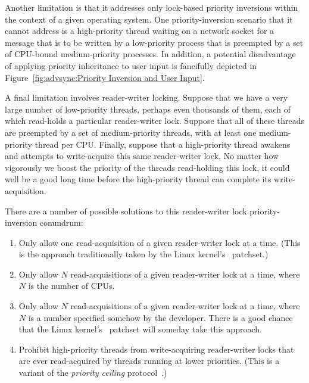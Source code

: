 Another limitation is that it addresses only lock-based priority
inversions within the context of a given operating system.
One priority-inversion scenario that it cannot address is a high-priority
thread waiting on a network socket for a message that is to be written
by a low-priority process that is preempted by a set of CPU-bound
medium-priority processes.
In addition, a potential disadvantage of applying priority inheritance
to user input is fancifully depicted in
Figure~\ref{fig:advsync:Priority Inversion and User Input}.

A final limitation involves reader-writer locking.
Suppose that we have a very large number of low-priority threads, perhaps
even thousands of them, each
of which read-holds a particular reader-writer lock.
Suppose that all of these threads are preempted by a set of medium-priority
threads, with at least one medium-priority thread per CPU.
Finally, suppose that a high-priority thread awakens and attempts to
write-acquire this same reader-writer lock.
No matter how vigorously we boost the priority of the threads read-holding
this lock, it could well be a good long time before the high-priority
thread can complete its write-acquisition.

There are a number of possible solutions to this reader-writer lock
priority-inversion conundrum:

\begin{enumerate}
\item	Only allow one read-acquisition of a given reader-writer lock
	at a time.  (This is the approach traditionally taken by
	the Linux kernel's \rt\ patchset.)
\item	Only allow $N$ read-acquisitions of a given reader-writer lock
	at a time, where $N$ is the number of CPUs.
\item	Only allow $N$ read-acquisitions of a given reader-writer lock
	at a time, where $N$ is a number specified somehow by the
	developer.
	There is a good chance that the Linux kernel's \rt\ patchset
	will someday take this approach.
\item	Prohibit high-priority threads from write-acquiring reader-writer
	locks that are ever read-acquired by threads running at lower
	priorities.
	(This is a variant of the \emph{priority ceiling}
	protocol~\cite{LuiSha1990PriorityInheritance}.)
\end{enumerate}

